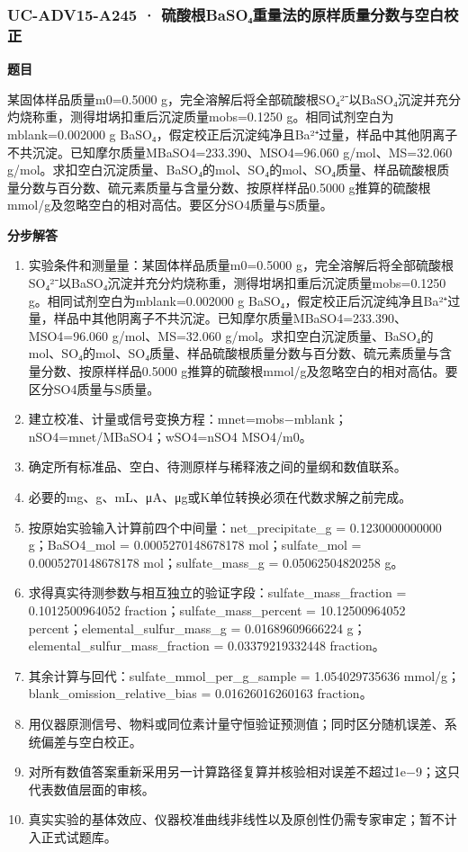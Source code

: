 \documentclass[UTF8,11pt,a4paper]{ctexart}
\begin{document}
\subsubsection*{UC-ADV15-A245 · 硫酸根BaSO₄重量法的原样质量分数与空白校正}
\noindent\textbf{题目}\par
某固体样品质量m0=0.5000 g，完全溶解后将全部硫酸根SO₄²⁻以BaSO₄沉淀并充分灼烧称重，测得坩埚扣重后沉淀质量mobs=0.1250 g。相同试剂空白为mblank=0.002000 g BaSO₄，假定校正后沉淀纯净且Ba²⁺过量，样品中其他阴离子不共沉淀。已知摩尔质量MBaSO4=233.390、MSO4=96.060 g/mol、MS=32.060 g/mol。求扣空白沉淀质量、BaSO₄的mol、SO₄的mol、SO₄质量、样品硫酸根质量分数与百分数、硫元素质量与含量分数、按原样样品0.5000 g推算的硫酸根mmol/g及忽略空白的相对高估。要区分SO4质量与S质量。\par
\medskip\noindent\textbf{分步解答}
\begin{enumerate}
\item 实验条件和测量量：某固体样品质量m0=0.5000 g，完全溶解后将全部硫酸根SO₄²⁻以BaSO₄沉淀并充分灼烧称重，测得坩埚扣重后沉淀质量mobs=0.1250 g。相同试剂空白为mblank=0.002000 g BaSO₄，假定校正后沉淀纯净且Ba²⁺过量，样品中其他阴离子不共沉淀。已知摩尔质量MBaSO4=233.390、MSO4=96.060 g/mol、MS=32.060 g/mol。求扣空白沉淀质量、BaSO₄的mol、SO₄的mol、SO₄质量、样品硫酸根质量分数与百分数、硫元素质量与含量分数、按原样样品0.5000 g推算的硫酸根mmol/g及忽略空白的相对高估。要区分SO4质量与S质量。
\item 建立校准、计量或信号变换方程：mnet=mobs−mblank；nSO4=mnet/MBaSO4；wSO4=nSO4 MSO4/m0。
\item 确定所有标准品、空白、待测原样与稀释液之间的量纲和数值联系。
\item 必要的mg、g、mL、μA、μg或K单位转换必须在代数求解之前完成。
\item 按原始实验输入计算前四个中间量：net\_precipitate\_g = 0.1230000000000 g；BaSO4\_mol = 0.0005270148678178 mol；sulfate\_mol = 0.0005270148678178 mol；sulfate\_mass\_g = 0.05062504820258 g。
\item 求得真实待测参数与相互独立的验证字段：sulfate\_mass\_fraction = 0.1012500964052 fraction；sulfate\_mass\_percent = 10.12500964052 percent；elemental\_sulfur\_mass\_g = 0.01689609666224 g；elemental\_sulfur\_mass\_fraction = 0.03379219332448 fraction。
\item 其余计算与回代：sulfate\_mmol\_per\_g\_sample = 1.054029735636 mmol/g；blank\_omission\_relative\_bias = 0.01626016260163 fraction。
\item 用仪器原测信号、物料或同位素计量守恒验证预测值；同时区分随机误差、系统偏差与空白校正。
\item 对所有数值答案重新采用另一计算路径复算并核验相对误差不超过1e−9；这只代表数值层面的审核。
\item 真实实验的基体效应、仪器校准曲线非线性以及原创性仍需专家审定；暂不计入正式试题库。
\end{enumerate}
\end{document}
